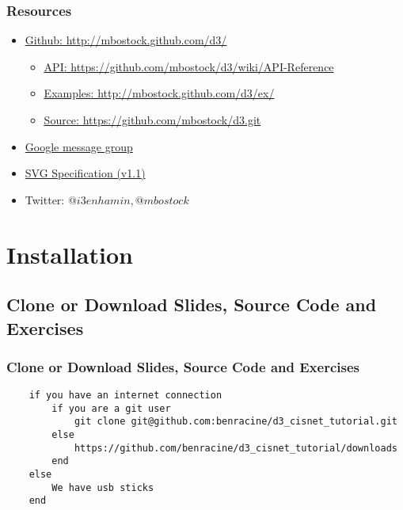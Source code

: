 \documentclass{beamer}
\begin{document}
\begin{frame}
    \frametitle{Resources}
\pause
        \begin{itemize}
        \item \href{http://mbostock.github.com/d3/}{\underline{Github}: http://mbostock.github.com/d3/}
\pause
            \begin{itemize}
            \item \href{https://github.com/mbostock/d3/wiki/API-Reference}{\underline{API}: https://github.com/mbostock/d3/wiki/API-Reference}
\pause
            \item \href{http://mbostock.github.com/d3/ex/}{\underline{Examples}: http://mbostock.github.com/d3/ex/}
\pause
            \item \href{https://github.com/mbostock/d3.git}{\underline{Source}: https://github.com/mbostock/d3.git}
            \end{itemize}
\pause
        \item \href{http://groups.google.com/group/d3-js?pli=1}{Google message group}
\pause
        \item \href{http://www.w3.org/TR/SVG/}{SVG Specification (v1.1)}
\pause
        \item Twitter: $@i3enhamin, @mbostock$
        \end{itemize}
\end{frame}



\section{Installation}

\subsection{Clone or Download Slides, Source Code and Exercises}

\begin{frame}[fragile]
    \frametitle{Clone or Download Slides, Source Code and Exercises}
        \tiny{
        \begin{verbatim}
    if you have an internet connection
        if you are a git user
            git clone git@github.com:benracine/d3_cisnet_tutorial.git
        else
            https://github.com/benracine/d3_cisnet_tutorial/downloads
        end
    else
        We have usb sticks
    end
        \end{verbatim}
        }
\end{frame}
\end{document}
